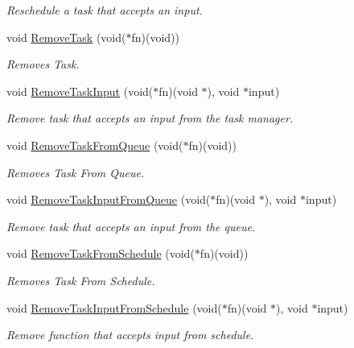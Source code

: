 \begin{DoxyCompactItemize}
\begin{DoxyCompactList}\small\item\em Reschedule a task that accepts an input. \end{DoxyCompactList}\item 
void \hyperlink{group__task_ga0cbcc7b4d487bea97c9feb7bb055745b}{Remove\+Task} (void($\ast$fn)(void))
\begin{DoxyCompactList}\small\item\em Removes Task. \end{DoxyCompactList}\item 
void \hyperlink{group__task_gae4ce82ae143ae0fdd183523bbd84422b}{Remove\+Task\+Input} (void($\ast$fn)(void $\ast$), void $\ast$input)
\begin{DoxyCompactList}\small\item\em Remove task that accepts an input from the task manager. \end{DoxyCompactList}\item 
void \hyperlink{group__task_ga65d31962fc809566ad27a3b2ce67b3fa}{Remove\+Task\+From\+Queue} (void($\ast$fn)(void))
\begin{DoxyCompactList}\small\item\em Removes Task From Queue. \end{DoxyCompactList}\item 
void \hyperlink{group__task_gaccc37b8ee3d3b7956e66d7c175d2fe5d}{Remove\+Task\+Input\+From\+Queue} (void($\ast$fn)(void $\ast$), void $\ast$input)
\begin{DoxyCompactList}\small\item\em Remove task that accepts an input from the queue. \end{DoxyCompactList}\item 
void \hyperlink{group__task_gafa9b5425e993bac4e5aa130daf3ceea7}{Remove\+Task\+From\+Schedule} (void($\ast$fn)(void))
\begin{DoxyCompactList}\small\item\em Removes Task From Schedule. \end{DoxyCompactList}\item 
void \hyperlink{group__task_ga78192a3385820da2cc4679cd51303ae7}{Remove\+Task\+Input\+From\+Schedule} (void($\ast$fn)(void $\ast$), void $\ast$input)
\begin{DoxyCompactList}\small\item\em Remove function that accepts input from schedule. \end{DoxyCompactList}\item 

\end{DoxyCompactItemize}
